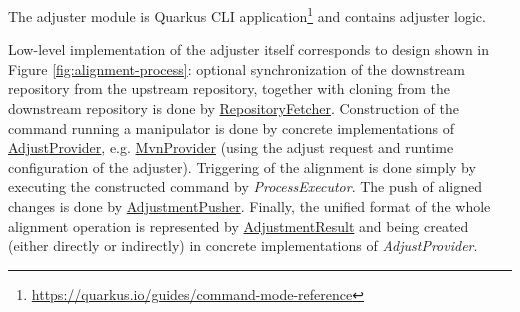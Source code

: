 \documentclass[../main.tex]{subfiles}
\begin{document}
The adjuster module is Quarkus CLI application\footnote{\url{https://quarkus.io/guides/command-mode-reference}} and contains adjuster logic.

Low-level implementation of the adjuster itself corresponds to design shown in Figure \ref{fig:alignment-process}: optional synchronization of the downstream repository from the upstream repository, together with cloning from the downstream repository is done by \href{https://github.com/project-ncl/reqour/blob/akridl-thesis/adjuster/src/main/java/org/jboss/pnc/reqour/adjust/service/RepositoryFetcher.java}{RepositoryFetcher}. Construction of the command running a manipulator is done by concrete implementations of \href{https://github.com/project-ncl/reqour/blob/akridl-thesis/adjuster/src/main/java/org/jboss/pnc/reqour/adjust/provider/AdjustProvider.java}{AdjustProvider}, e.g. \href{https://github.com/project-ncl/reqour/blob/akridl-thesis/adjuster/src/main/java/org/jboss/pnc/reqour/adjust/provider/MvnProvider.java##L102}{MvnProvider} (using the adjust request and runtime configuration of the adjuster). Triggering of the alignment is done simply by executing the constructed command by \textit{ProcessExecutor}. The push of aligned changes is done by \href{https://github.com/project-ncl/reqour/blob/akridl-thesis/adjuster/src/main/java/org/jboss/pnc/reqour/adjust/service/AdjustmentPusher.java}{AdjustmentPusher}. Finally, the unified format of the whole alignment operation is represented by \href{https://github.com/project-ncl/reqour/blob/akridl-thesis/adjuster/src/main/java/org/jboss/pnc/reqour/adjust/model/AdjustmentResult.java}{AdjustmentResult} and being created (either directly or indirectly) in concrete implementations of \textit{AdjustProvider}.
\end{document}
